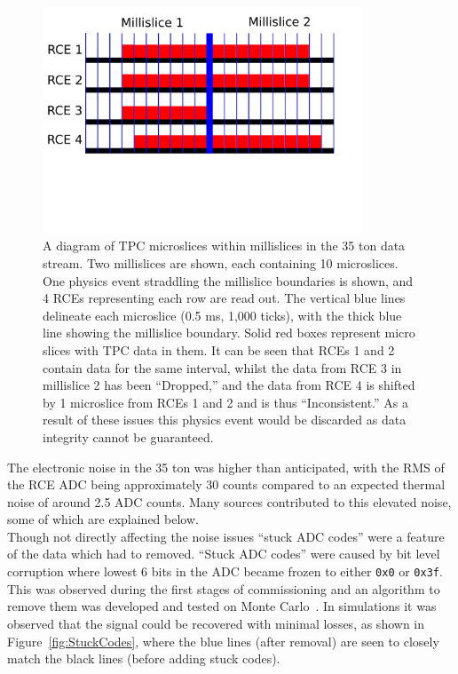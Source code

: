 \begin{figure}
  \centering
  \includegraphics[width=0.85\textwidth]{DataDrops}
  \caption[Dropped TPC data in the 35 ton]
          {A diagram of TPC microslices within millislices in the 35 ton data stream. Two millislices are shown, each containing 10 microslices. One physics event straddling the millislice boundaries is shown, and 4 RCEs representing each row are read out. The vertical blue lines delineate each microslice (0.5 ms, 1,000 ticks), with the thick blue line showing the millislice boundary. Solid red boxes represent micro slices with TPC data in them. It can be seen that RCEs 1 and 2 contain data for the same interval, whilst the data from RCE 3 in millislice 2 has been ``Dropped,'' and the data from RCE 4 is shifted by 1 microslice from RCEs 1 and 2 and is thus ``Inconsistent.'' As a result of these issues this physics event would be discarded as data integrity cannot be guaranteed.}
  \label{fig:DataDrops}
\end{figure}

The electronic noise in the 35 ton was higher than anticipated, with the RMS of the RCE ADC being approximately 30 counts compared to an expected thermal noise of around 2.5 ADC counts. Many sources contributed to this elevated noise, some of which are explained below. \\

Though not directly affecting the noise issues ``stuck ADC codes'' were a feature of the data which had to removed. ``Stuck ADC codes'' were caused by bit level corruption where lowest 6 bits in the ADC became frozen to either {\tt 0x0} or {\tt 0x3f}. This was observed during the first stages of commissioning and an algorithm to remove them was developed and tested on Monte Carlo~\citep{InslerStuckCode}. In simulations it was observed that the signal could be recovered with minimal losses, as shown in Figure~\ref{fig:StuckCodes}, where the blue lines (after removal) are seen to closely match the black lines (before adding stuck codes). \\

